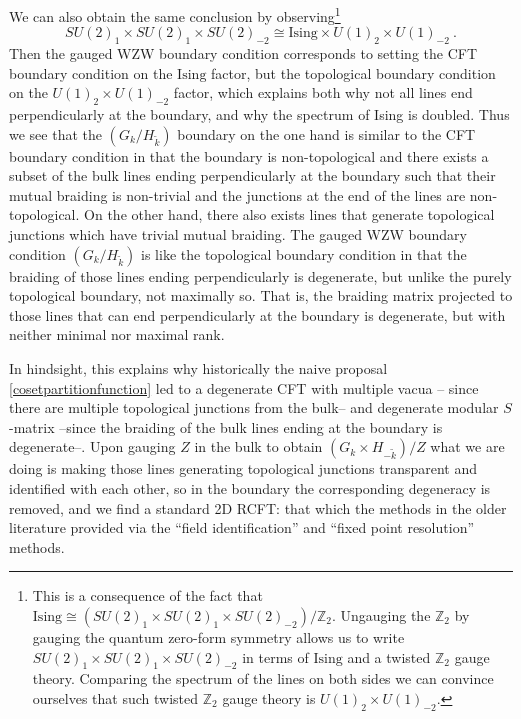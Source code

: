 \documentclass[11pt]{article}
\numberwithin{equation}{section}
\begin{document}
We can also obtain the same conclusion by observing\footnote{This is a consequence of the fact that $\mathrm{Ising} \cong (SU(2)_{1} \times SU(2)_{1} \times SU(2)_{-2})/\mathbb{Z}_{2}$. Ungauging the $\mathbb{Z}_{2}$ by gauging the quantum zero-form symmetry allows us to write $SU(2)_{1} \times SU(2)_{1} \times SU(2)_{-2}$ in terms of $\mathrm{Ising}$ and a twisted $\mathbb{Z}_{2}$ gauge theory. Comparing the spectrum of the lines on both sides we can convince ourselves that such twisted $\mathbb{Z}_{2}$ gauge theory is $U(1)_{2} \times U(1)_{-2}$.}
\begin{equation}
    SU(2)_{1} \times SU(2)_{1} \times SU(2)_{-2} \cong \mathrm{Ising} \times U(1)_{2} \times U(1)_{-2}~.
\end{equation}
Then the gauged WZW boundary condition corresponds to setting the CFT boundary condition on the $\mathrm{Ising}$ factor, but the topological boundary condition on the $U(1)_{2} \times U(1)_{-2}$ factor, which explains both why not all lines end perpendicularly at the boundary, and why the spectrum of Ising is doubled. Thus we see that the $(G_{k}/H_{\tilde{k}})$ boundary on the one hand is similar to the CFT boundary condition in that the boundary is non-topological and there exists a subset of the bulk lines ending perpendicularly at the boundary such that their mutual braiding is non-trivial and the junctions at the end of the lines are non-topological. On the other hand, there also exists lines that generate topological junctions which have trivial mutual braiding. The gauged WZW boundary condition $(G_{k}/H_{\tilde{k}})$ is like the topological boundary condition in that the braiding of those lines ending perpendicularly is degenerate, but unlike the purely topological boundary, not maximally so. That is, the braiding matrix projected to those lines that can end perpendicularly at the boundary is degenerate, but with neither minimal nor maximal rank.

In hindsight, this explains why historically the naive proposal \eqref{cosetpartitionfunction} led to a degenerate CFT with multiple vacua -- since there are multiple topological junctions from the bulk-- and degenerate modular $S$-matrix --since the braiding of the bulk lines ending at the boundary is degenerate--. Upon gauging $Z$ in the bulk to obtain $(G_{k} \times H_{-\tilde{k}})/Z$ what we are doing is making those lines generating topological junctions transparent and identified with each other, so in the boundary the corresponding degeneracy is removed, and we find a standard 2D RCFT: that which the methods in the older literature provided via the ``field identification'' and ``fixed point resolution'' methods.
\end{document}
